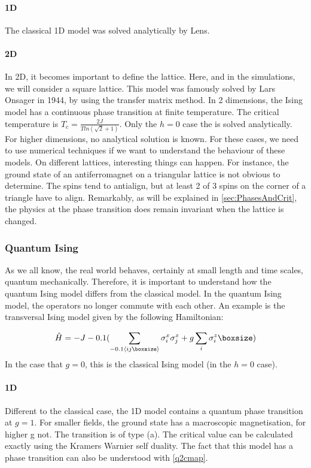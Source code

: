 \paragraph{1D}

The classical 1D model was solved analytically by Lens. 

\paragraph{2D}

In 2D, it becomes important to define the lattice. Here, and in the simulations, we will consider a square lattice. This model was famously solved by Lars Onsager in 1944, by using the transfer matrix method. In 2 dimensions, the Ising model has a continuous phase transition at finite temperature. The critical temperature is $T_c = \frac{2 J}{T ln( \sqrt{2}+1)}$. Only the $h=0$ case the is solved analytically. For higher dimensions, no analytical solution is known. For these cases, we need to use numerical techniques if we want to understand the behaviour of these models. On different lattices, interesting things can happen. For instance, the ground state of an antiferromagnet on a triangular lattice is not obvious to determine. The spins tend to antialign, but at least 2 of 3 spins on the corner of a triangle have to align. Remarkably, as will be explained in \cref{sec:PhasesAndCrit}, the physics at the phase transition does remain invariant when the lattice is changed. 

\subsubsection{Quantum Ising}

As we all know, the real world behaves, certainly at small length and time scales, quantum mechanically. Therefore, it is important to understand how the quantum Ising model differs from the classical model. In the quantum Ising model, the operators no longer commute with each other. An example is the transversal Ising model given by the following Hamiltonian:

\begin{equation}
    \hat{H} = -J \left (  \sum_{\Braket{i j }} \sigma^x_i \sigma^x_j + g \sum_i \sigma^z_i \right )
\end{equation}
In the case that $g=0$, this is the classical Ising model (in the $h=0$ case).

\paragraph{1D}
Different to the classical case, the 1D model contains a quantum phase transition at $g=1$. For smaller fields, the ground state has a macroscopic magnetisation, for higher g not. The transition is of type  (a). The critical value can be calculated exactly using the Kramers Warnier self duality.  The fact that this model has a phase transition can also be understood with \cref{q2cmap}.

